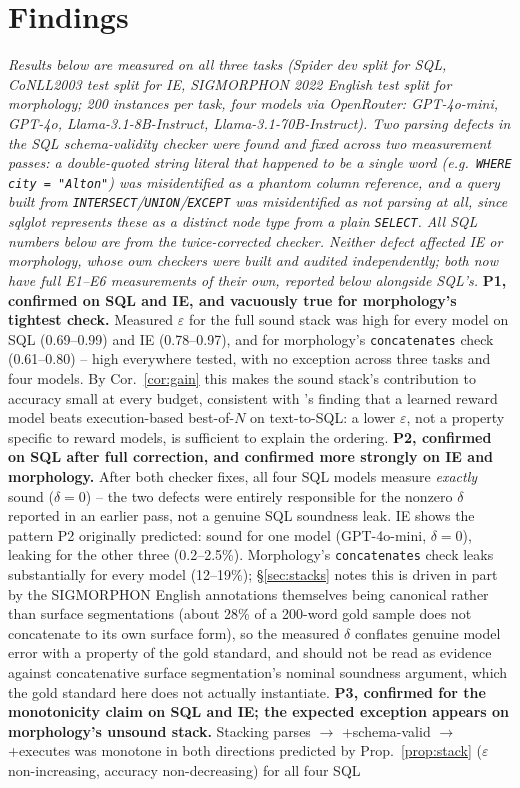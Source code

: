 \documentclass[11pt]{article}
\begin{document}
\section{Findings}\label{sec:results}
\emph{Results below are measured on all three tasks (Spider dev split for SQL, CoNLL2003 test split for IE, SIGMORPHON 2022 English test split for morphology; 200 instances per task, four models via OpenRouter: GPT-4o-mini, GPT-4o, Llama-3.1-8B-Instruct, Llama-3.1-70B-Instruct). Two parsing defects in the SQL schema-validity checker were found and fixed across two measurement passes: a double-quoted string literal that happened to be a single word (e.g.\ \texttt{WHERE city = "Alton"}) was misidentified as a phantom column reference, and a query built from \texttt{INTERSECT}/\texttt{UNION}/\texttt{EXCEPT} was misidentified as not parsing at all, since sqlglot represents these as a distinct node type from a plain \texttt{SELECT}. All SQL numbers below are from the twice-corrected checker. Neither defect affected IE or morphology, whose own checkers were built and audited independently; both now have full E1--E6 measurements of their own, reported below alongside SQL's.} \textbf{P1, confirmed on SQL and IE, and vacuously true for morphology's tightest check.} Measured $\varepsilon$ for the full sound stack was high for every model on SQL (0.69--0.99) and IE (0.78--0.97), and for morphology's \texttt{concatenates} check (0.61--0.80) -- high everywhere tested, with no exception across three tasks and four models. By Cor.~\ref{cor:gain} this makes the sound stack's contribution to accuracy small at every budget, consistent with \citet{gradesql2026}'s finding that a learned reward model beats execution-based best-of-$N$ on text-to-SQL: a lower $\varepsilon$, not a property specific to reward models, is sufficient to explain the ordering. \textbf{P2, confirmed on SQL after full correction, and confirmed more strongly on IE and morphology.} After both checker fixes, all four SQL models measure \emph{exactly} sound ($\delta=0$) -- the two defects were entirely responsible for the nonzero $\delta$ reported in an earlier pass, not a genuine SQL soundness leak. IE shows the pattern P2 originally predicted: sound for one model (GPT-4o-mini, $\delta=0$), leaking for the other three (0.2--2.5\%). Morphology's \texttt{concatenates} check leaks substantially for every model (12--19\%); \S\ref{sec:stacks} notes this is driven in part by the SIGMORPHON English annotations themselves being canonical rather than surface segmentations (about 28\% of a 200-word gold sample does not concatenate to its own surface form), so the measured $\delta$ conflates genuine model error with a property of the gold standard, and should not be read as evidence against concatenative surface segmentation's nominal soundness argument, which the gold standard here does not actually instantiate. \textbf{P3, confirmed for the monotonicity claim on SQL and IE; the expected exception appears on morphology's unsound stack.} Stacking parses $\to$ +schema-valid $\to$ +executes was monotone in both directions predicted by Prop.~\ref{prop:stack} ($\varepsilon$ non-increasing, accuracy non-decreasing) for all four SQL 
\end{document}
